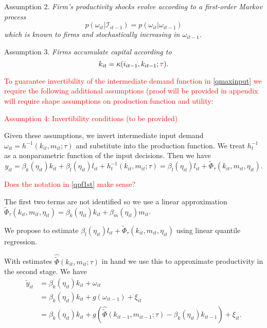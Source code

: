 \documentclass[11pt]{article}
\begin{document}
Assumption 2. \textit{Firm's productivity shocks evolve according to a first-order Markov process}
\begin{equation}
p(\omega_{it}|\mathcal{I}_{it-1})=p(\omega_{it}|\omega_{it-1})
\end{equation}
\textit{which is known to firms and stochastically increasing in $\omega_{it-1}$}.

Assumption 3. \textit{Firms accumulate capital according to}
\begin{equation}
    k_{it}=\kappa(i_{it-1}, k_{it-1}; \textcolor{red}{\tau}).
\end{equation}

\textcolor{red}{To guarantee invertibility of the intermediate demand function in \eqref{qmaxinput} we require the following additional assumptions (proof will be provided in appendix will require shape assumptions on production function and utility:}

\textcolor{red}{Assumption 4: Invertibility conditions (to be provided)}

Given these assumptions, we invert intermediate input demand $\omega_{it}=h^{-1}(k_{it}, m_{it}; \tau)$ and substitute into the production function. We treat $h_{t}^{-1}$ as a nonparametric function of the input decisions. Then we have
\begin{equation} \label{qpf1st}
y_{it}=\beta_{k}(\eta_{it})k_{it}+\beta_{l}(\eta_{it})l_{it}+h_{t}^{-1}(k_{it}, m_{it}; \tau)=\beta_{l}(\eta_{it})l_{it}+\tilde{\Phi}_{\tau}(k_{it}, m_{it}, \eta_{it}).
\end{equation}

\textcolor{red}{Does the notation in \eqref{qpf1st} make sense?}

The first two terms are not identified so we use a linear approximation $\tilde{\Phi}_{\tau}(k_{it}, m_{it}, \eta_{it})=\beta_{k}(\eta_{it})k_{it}+\beta_{m}(\eta_{it})m_{it}$.

We propose to estimate $\beta_{l}(\eta_{it})l_{it}+\tilde{\Phi}_{\tau}(k_{it}, m_{it}, \eta_{it})$ using linear quantile regression.

With estimates $\hat{\tilde{\Phi}}(k_{it}, m_{it}; \tau)$ in hand we use this to approximate productivity in the second stage. We have
\begin{equation} \label{qpf2nd}
\begin{split}
\tilde{y}_{it}&=\beta_{k}(\eta_{it})k_{it}+\omega_{it}\\
&=\beta_{k}(\eta_{it})k_{it}+g(\omega_{it-1})+\xi_{it}\\
&=\beta_{k}(\eta_{it})k_{it}+g(\hat{\tilde{\Phi}}(k_{it-1}, m_{it-1}; \tau)-\beta_{k}(\eta_{it})k_{it-1})+\xi_{it}.
\end{split}
\end{equation}
\end{document}

